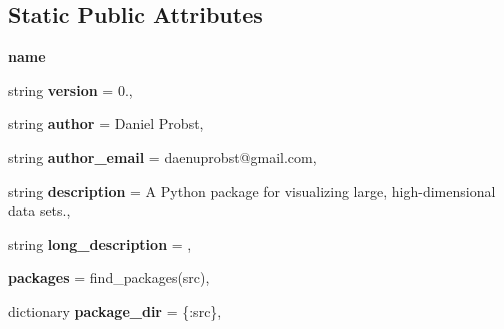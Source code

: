 \subsection*{Static Public Attributes}
\begin{DoxyCompactItemize}
\item 
\mbox{\label{classsetup_1_1CMakeBuild_a69fdf44d0e0f8528b45b5b5dc205d13a}} 
{\bfseries name}
\item 
\mbox{\label{classsetup_1_1CMakeBuild_a55193e7e37c21db6086d66ca0406bca4}} 
string {\bfseries version} = \textquotesingle{}0.\textquotesingle{},
\item 
\mbox{\label{classsetup_1_1CMakeBuild_a07b78cf40fab1fc47f5d0ed12a5da188}} 
string {\bfseries author} = \textquotesingle{}Daniel Probst\textquotesingle{},
\item 
\mbox{\label{classsetup_1_1CMakeBuild_a5895355ef0154a602a1b3292d59d7c0b}} 
string {\bfseries author\+\_\+email} = \textquotesingle{}daenuprobst@gmail.\+com\textquotesingle{},
\item 
\mbox{\label{classsetup_1_1CMakeBuild_a7c70aa680601a5b37ac422d82b9d4a48}} 
string {\bfseries description} = \textquotesingle{}A Python package for visualizing large, high-\/dimensional data sets.\textquotesingle{},
\item 
\mbox{\label{classsetup_1_1CMakeBuild_a164a63fbc4505a2a343cc1b56fc08162}} 
string {\bfseries long\+\_\+description} = \textquotesingle{}\textquotesingle{},
\item 
\mbox{\label{classsetup_1_1CMakeBuild_afba1e1ac8295c6e19de725c23bb2bb0c}} 
{\bfseries packages} = find\+\_\+packages(\textquotesingle{}src\textquotesingle{}),
\item 
\mbox{\label{classsetup_1_1CMakeBuild_a7a07cd1759aa40f412c536b58a78a9b1}} 
dictionary {\bfseries package\+\_\+dir} = \{\textquotesingle{}\textquotesingle{}\+:\textquotesingle{}src\textquotesingle{}\},
\item 
\mbox{\label{classsetup_1_1CMakeBuild_a213a67190dedd09dc626d6d054fdb45b}} 

\end{DoxyCompactItemize}
